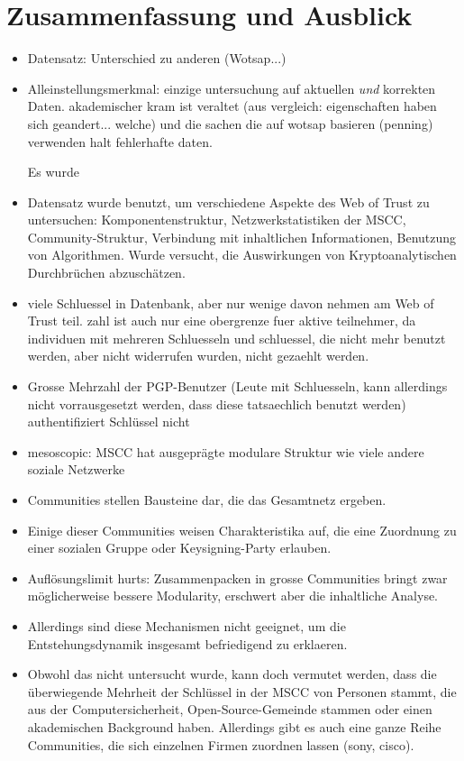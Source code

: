
\chapter{Zusammenfassung und Ausblick}
\label{ch:Zusammenfassung}

\begin{itemize}

\item Datensatz: Unterschied zu anderen (Wotsap...)

\item Alleinstellungsmerkmal: einzige untersuchung auf aktuellen
  \emph{und} korrekten Daten. akademischer kram ist veraltet (aus
  vergleich: eigenschaften haben sich geandert... welche) und die
  sachen die auf wotsap basieren (penning) verwenden halt fehlerhafte
  daten.

Es wurde 

\item Datensatz wurde benutzt, um verschiedene Aspekte des Web of
  Trust zu untersuchen: Komponentenstruktur, Netzwerkstatistiken der
  MSCC, Community-Struktur, Verbindung mit inhaltlichen Informationen,
  Benutzung von Algorithmen. Wurde versucht, die Auswirkungen von
  Kryptoanalytischen Durchbr\"uchen abzusch\"atzen.

\item viele Schluessel in Datenbank, aber nur wenige davon nehmen am
  Web of Trust teil. zahl ist auch nur eine obergrenze fuer aktive
  teilnehmer, da individuen mit mehreren Schluesseln und schluessel,
  die nicht mehr benutzt werden, aber nicht widerrufen wurden, nicht
  gezaehlt werden.
\item Grosse Mehrzahl der PGP-Benutzer (Leute mit Schluesseln,
  kann allerdings nicht vorrausgesetzt werden, dass diese tatsaechlich
  benutzt werden) authentifiziert Schl\"ussel nicht



\item mesoscopic: MSCC hat ausgepr\"agte modulare Struktur wie viele andere
  soziale Netzwerke
\item Communities stellen Bausteine dar, die das Gesamtnetz ergeben.
\item Einige dieser Communities weisen Charakteristika auf, die eine
  Zuordnung zu einer sozialen Gruppe oder Keysigning-Party erlauben.
\item Aufl\"osungslimit hurts: Zusammenpacken in grosse Communities
  bringt zwar m\"oglicherweise bessere Modularity, erschwert aber die
  inhaltliche Analyse.
\item Allerdings sind diese Mechanismen nicht geeignet, um die
  Entstehungsdynamik insgesamt befriedigend zu erklaeren.
\item Obwohl das nicht untersucht wurde, kann doch vermutet werden,
  dass die \"uberwiegende Mehrheit der Schl\"ussel in der MSCC von
  Personen stammt, die aus der Computersicherheit,  Open-Source-Gemeinde stammen oder einen
  akademischen Background haben. Allerdings gibt es auch eine ganze
  Reihe Communities, die sich einzelnen Firmen zuordnen lassen (sony,
  cisco). 


\end{itemize}
